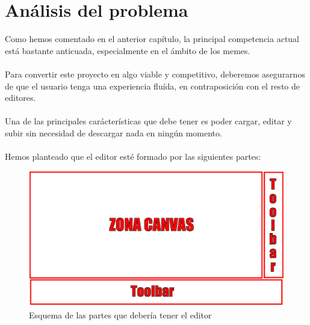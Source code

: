 \chapter{Análisis del problema}

Como hemos comentado en el anterior capítulo, la principal competencia actual está 
bastante anticuada, especialmente en el ámbito de los memes.
\\\\
Para convertir este proyecto en algo viable y competitivo, deberemos asegurarnos de que
el usuario tenga una experiencia fluída, en contraposición con el resto de editores.
\\\\
Una de las principales carácterísticas que debe tener es poder cargar, editar y subir sin
necesidad de descargar nada en ningún momento.
\\\\
Hemos planteado que el editor esté formado por las siguientes partes:

\begin{figure}[!h]
    \centering
    \includegraphics[scale=0.30]{img/ESQUEMA_ABSTRACTO.png}
    \caption{Esquema de las partes que debería tener el editor}
\end{figure}